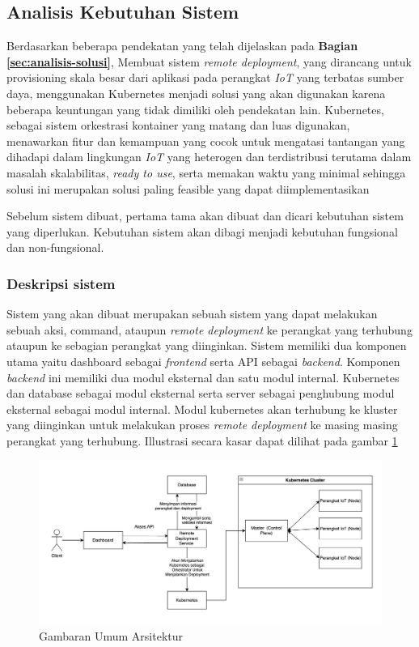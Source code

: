 \subsection{Analisis Kebutuhan Sistem}
\label{sec:analisis-kebutuhan-sistem}

Berdasarkan beberapa pendekatan yang telah dijelaskan pada \textbf{Bagian \ref{sec:analisis-solusi}}, Membuat sistem \textit{remote deployment}, yang dirancang untuk provisioning skala besar dari aplikasi pada perangkat \textit{IoT} yang terbatas sumber daya, menggunakan Kubernetes menjadi solusi yang akan digunakan karena beberapa keuntungan yang tidak dimiliki oleh pendekatan lain. Kubernetes, sebagai sistem orkestrasi kontainer yang matang dan luas digunakan, menawarkan fitur dan kemampuan yang cocok untuk mengatasi tantangan yang dihadapi dalam lingkungan \textit{IoT} yang heterogen dan terdistribusi terutama dalam masalah skalabilitas, \textit{ready to use}, serta memakan waktu yang minimal sehingga solusi ini merupakan solusi paling feasible yang dapat diimplementasikan


Sebelum sistem dibuat, pertama tama akan dibuat dan dicari kebutuhan sistem yang diperlukan. Kebutuhan sistem akan dibagi menjadi kebutuhan fungsional dan non-fungsional.

\subsubsection{Deskripsi sistem}
Sistem yang akan dibuat merupakan sebuah sistem yang dapat melakukan sebuah aksi, command, ataupun \textit{remote deployment} ke perangkat yang terhubung ataupun ke sebagian perangkat yang diinginkan. Sistem memiliki dua komponen utama yaitu dashboard sebagai \textit{frontend} serta API sebagai \textit{backend}. Komponen \textit{backend} ini memiliki dua modul eksternal dan satu modul internal. Kubernetes dan database sebagai modul eksternal serta server sebagai penghubung modul eksternal sebagai modul internal. Modul kubernetes akan terhubung ke kluster yang diinginkan untuk melakukan proses \textit{remote deployment} ke masing masing perangkat yang terhubung. Illustrasi secara kasar dapat dilihat pada gambar \ref{fig:gambaran-umum-arsitektur}

\begin{figure}[ht]
  \centering
  \includegraphics[width=1\textwidth]{resources/chapter-3/gambaran-umum-arsitektur-updated.jpg}
  \caption{Gambaran Umum Arsitektur}
  \label{fig:gambaran-umum-arsitektur}
\end{figure}

\pagebreak







